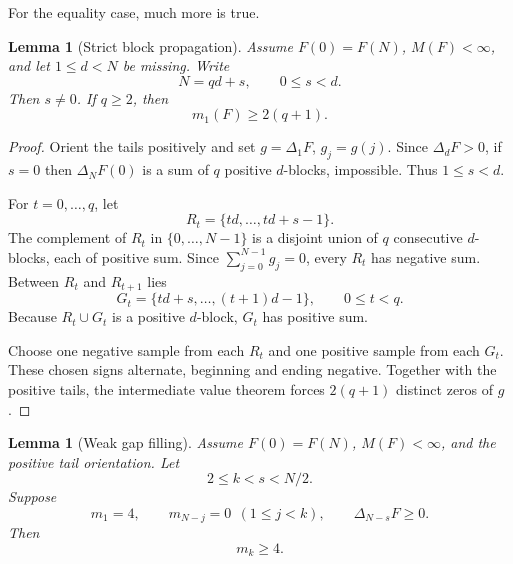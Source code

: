 \documentclass[11pt]{article}
\newtheorem{lemma}[theorem]{Lemma}
\theoremstyle{definition}
\theoremstyle{remark}
\begin{document}
For the equality case, much more is true.

\begin{lemma}[Strict block propagation]\label{lem:strict-block}
Assume \(F(0)=F(N)\), \(M(F)<\infty\), and let \(1\le d<N\) be missing.
Write
\[
N=qd+s,\qquad 0\le s<d.
\]
Then \(s\ne0\).  If \(q\ge2\), then
\[
m_1(F)\ge2(q+1).
\]
\end{lemma}

\begin{proof}
Orient the tails positively and set \(g=\Delta_1F\),
\(g_j=g(j)\).  Since \(\Delta_dF>0\), if \(s=0\) then
\(\Delta_NF(0)\) is a sum of \(q\) positive \(d\)-blocks, impossible.
Thus \(1\le s<d\).

For \(t=0,\ldots,q\), let
\[
R_t=\{td,\ldots,td+s-1\}.
\]
The complement of \(R_t\) in \(\{0,\ldots,N-1\}\) is a disjoint union
of \(q\) consecutive \(d\)-blocks, each of positive sum.  Since
\(\sum_{j=0}^{N-1}g_j=0\), every \(R_t\) has negative sum.
Between \(R_t\) and \(R_{t+1}\) lies
\[
G_t=\{td+s,\ldots,(t+1)d-1\},
\qquad 0\le t<q.
\]
Because \(R_t\cup G_t\) is a positive \(d\)-block, \(G_t\) has positive
sum.

Choose one negative sample from each \(R_t\) and one positive sample from
each \(G_t\).  These chosen signs alternate, beginning and ending
negative.  Together with the positive tails, the intermediate value
theorem forces \(2(q+1)\) distinct zeros of \(g\).
\end{proof}

\begin{lemma}[Weak gap filling]\label{lem:weak-gap}
Assume \(F(0)=F(N)\), \(M(F)<\infty\), and the positive tail orientation.
Let
\[
2\le k<s<N/2.
\]
Suppose
\[
m_1=4,\qquad
m_{N-j}=0\ \ (1\le j<k),\qquad
\Delta_{N-s}F\ge0.
\]
Then
\[
m_k\ge4.
\]
\end{lemma}
\end{document}
